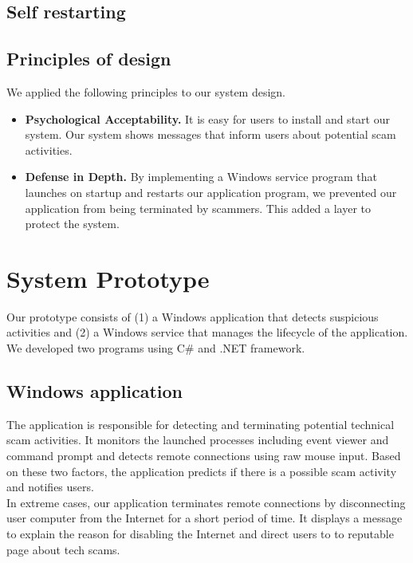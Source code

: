 \documentclass[final]{IEEEtran}
\begin{document}
\subsection{Self restarting}

\subsection{Principles of design}
We applied the following principles to our system design.
\begin{itemize}
  \item\textbf{ Psychological Acceptability.} It is easy for users to install and start our system. Our system shows messages that inform users about potential scam activities. 
  \item\textbf{ Defense in Depth.} By implementing a Windows service program that launches on startup and restarts our application program, we prevented our application from being terminated by scammers. This added a layer to protect the system. 
\end{itemize}

\section{System Prototype} %
Our prototype consists of (1) a Windows application that detects suspicious activities and (2) a Windows service that manages the lifecycle of the application. We developed two programs using C\# and .NET framework. 

\subsection{Windows application}
The application is responsible for detecting and terminating potential technical scam activities. It monitors the launched processes including event viewer and command prompt and detects remote connections using raw mouse input. Based on these two factors, the application predicts if there is a possible scam activity and notifies users.\\
In extreme cases, our application terminates remote connections by disconnecting user computer from the Internet for a short period of time. It displays a message to explain the reason for disabling the Internet and direct users to to reputable page about tech scams.
\end{document}
